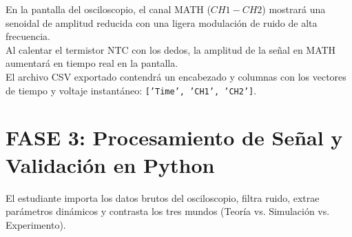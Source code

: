 \documentclass[11pt,a4paper]{article}
\begin{document}
\begin{resultado}
En la pantalla del osciloscopio, el canal MATH ($CH1 - CH2$) mostrará una senoidal de amplitud reducida con una ligera modulación de ruido de alta frecuencia.\\
Al calentar el termistor NTC con los dedos, la amplitud de la señal en MATH aumentará en tiempo real en la pantalla.\\
El archivo CSV exportado contendrá un encabezado y columnas con los vectores de tiempo y voltaje instantáneo: \texttt{['Time', 'CH1', 'CH2']}.
\end{resultado}

\newpage
\section*{FASE 3: Procesamiento de Señal y Validación en Python}
El estudiante importa los datos brutos del osciloscopio, filtra ruido, extrae parámetros dinámicos y contrasta los tres mundos (Teoría vs. Simulación vs. Experimento).
\end{document}
